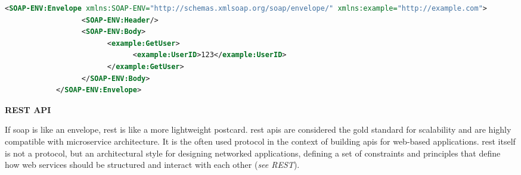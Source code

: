       \begin{lstlisting}[language=XML, caption=Example of a SOAP request, label=lst:soaprequest]
            <SOAP-ENV:Envelope xmlns:SOAP-ENV="http://schemas.xmlsoap.org/soap/envelope/" xmlns:example="http://example.com">
                  <SOAP-ENV:Header/>
                  <SOAP-ENV:Body>
                        <example:GetUser>
                              <example:UserID>123</example:UserID>
                        </example:GetUser>
                  </SOAP-ENV:Body>
            </SOAP-ENV:Envelope>
      \end{lstlisting}
 
      \begin{multicols}{2}
      \textbf{REST API}

      If \acrshort{soap} is like an envelope, \acrshort{rest} is like a  more lightweight postcard. \acrshort{rest} 
      \acrshort{api}s are considered the gold standard for scalability and are highly compatible with microservice 
      architecture. It is the often used protocol in the context of building \acrshort{api}s for web-based 
      applications. \acrshort{rest} itself is not a protocol, but an architectural style for designing networked
      applications, defining a set of constraints and principles that define how web services should be structured
      and interact with each other (\textit{see \gls{REST}}).


\end{multicols}
